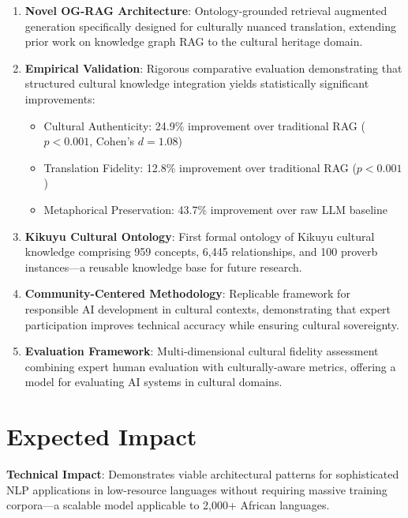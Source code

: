 \documentclass[11pt,a4paper]{article}
\begin{document}
\begin{enumerate}
    \item \textbf{Novel OG-RAG Architecture}: Ontology-grounded retrieval augmented generation specifically designed for culturally nuanced translation, extending prior work on knowledge graph RAG to the cultural heritage domain.
    
    \item \textbf{Empirical Validation}: Rigorous comparative evaluation demonstrating that structured cultural knowledge integration yields statistically significant improvements:
    \begin{itemize}
        \item Cultural Authenticity: 24.9\% improvement over traditional RAG ($p < 0.001$, Cohen's $d = 1.08$)
        \item Translation Fidelity: 12.8\% improvement over traditional RAG ($p < 0.001$)
        \item Metaphorical Preservation: 43.7\% improvement over raw LLM baseline
    \end{itemize}
    
    \item \textbf{Kikuyu Cultural Ontology}: First formal ontology of Kikuyu cultural knowledge comprising 959 concepts, 6,445 relationships, and 100 proverb instances---a reusable knowledge base for future research.
    
    \item \textbf{Community-Centered Methodology}: Replicable framework for responsible AI development in cultural contexts, demonstrating that expert participation improves technical accuracy while ensuring cultural sovereignty.
    
    \item \textbf{Evaluation Framework}: Multi-dimensional cultural fidelity assessment combining expert human evaluation with culturally-aware metrics, offering a model for evaluating AI systems in cultural domains.
\end{enumerate}

\vspace{10pt}

\section*{Expected Impact}

\textbf{Technical Impact}: Demonstrates viable architectural patterns for sophisticated NLP applications in low-resource languages without requiring massive training corpora---a scalable model applicable to 2,000+ African languages.
\end{document}
